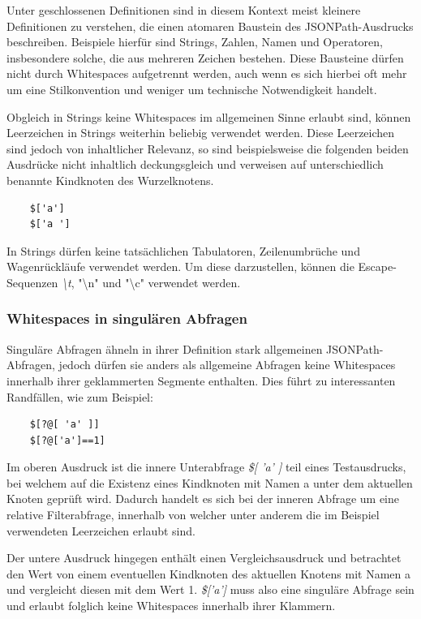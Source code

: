 \documentclass[oneside]{ausarbeitung}
\begin{document}
Unter geschlossenen Definitionen sind in diesem Kontext meist kleinere Definitionen zu verstehen, die einen atomaren Baustein des JSONPath-Ausdrucks beschreiben. Beispiele hierfür sind Strings, Zahlen, Namen und Operatoren, insbesondere solche, die aus mehreren Zeichen bestehen. Diese Bausteine dürfen nicht durch Whitespaces aufgetrennt werden, auch wenn es sich hierbei oft mehr um eine Stilkonvention und weniger um technische Notwendigkeit handelt.
	
Obgleich in Strings keine Whitespaces im allgemeinen Sinne erlaubt sind, können Leerzeichen in Strings weiterhin beliebig verwendet werden. Diese Leerzeichen sind jedoch von inhaltlicher Relevanz, so sind beispielsweise die folgenden beiden Ausdrücke nicht inhaltlich deckungsgleich und verweisen auf unterschiedlich benannte Kindknoten des Wurzelknotens.
	
\begin{lstlisting}
	$['a']
	$['a ']
\end{lstlisting}
	
In Strings dürfen keine tatsächlichen Tabulatoren, Zeilenumbrüche und Wagenrückläufe verwendet werden. Um diese darzustellen, können die Escape-Sequenzen \textit{\textbackslash t}, "\textbackslash{}n" und "\textbackslash{}c" verwendet werden.
	
	
	
\subsubsection{Whitespaces in singulären Abfragen}
	
	
Singuläre Abfragen ähneln in ihrer Definition stark allgemeinen JSONPath-Abfragen, jedoch dürfen sie anders als allgemeine Abfragen keine Whitespaces innerhalb ihrer geklammerten Segmente enthalten.
Dies führt zu interessanten Randfällen, wie zum Beispiel:
	
\begin{lstlisting}
	$[?@[ 'a' ]]
	$[?@['a']==1]
\end{lstlisting}
	
Im oberen Ausdruck ist die innere Unterabfrage \textit{\$[ 'a' ]} teil eines Testausdrucks, bei welchem auf die Existenz eines Kindknoten mit Namen a unter dem aktuellen Knoten geprüft wird. Dadurch handelt es sich bei der inneren Abfrage um eine relative Filterabfrage, innerhalb von welcher unter anderem die im Beispiel verwendeten Leerzeichen erlaubt sind. 
	
Der untere Ausdruck hingegen enthält einen Vergleichsausdruck und betrachtet den Wert von einem eventuellen Kindknoten des aktuellen Knotens mit Namen a und vergleicht diesen mit dem Wert 1. \textit{\$['a']} muss also eine singuläre Abfrage sein und erlaubt folglich keine Whitespaces innerhalb ihrer Klammern.
	
\end{document}
